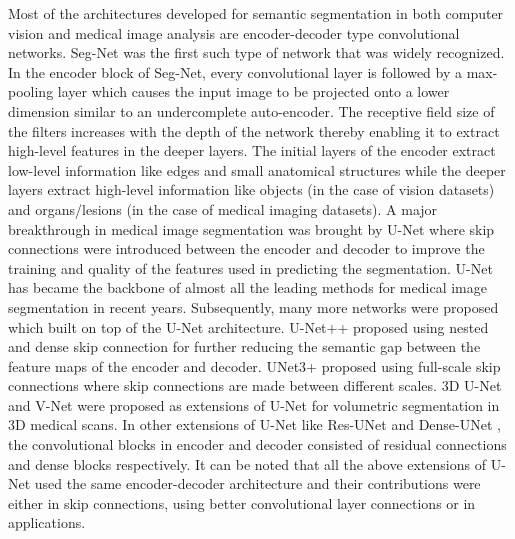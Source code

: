 \documentclass[journal,twoside,web]{ieeecolor}
\begin{document}
Most of the architectures developed for semantic segmentation in both computer vision and medical image analysis are encoder-decoder type convolutional networks. Seg-Net \cite{badrinarayanan2017segnet} was the first such type of network that was widely recognized. In the encoder block of Seg-Net, every convolutional layer is followed by a max-pooling layer which causes the input image to be projected onto a lower dimension similar to an undercomplete auto-encoder. The receptive field size of the filters increases with the depth of the network thereby enabling it to extract high-level features in the deeper layers. The initial layers of the encoder extract low-level information like edges and small anatomical structures while the deeper layers extract high-level information like objects (in the case of vision datasets) and organs/lesions (in the case of medical imaging datasets). A major breakthrough in medical image segmentation was brought by U-Net \cite{ronneberger2015u} where skip connections were introduced between the encoder and decoder to improve the training and quality of the features used in predicting the segmentation. U-Net has became the backbone of almost all the leading methods for medical image segmentation in recent years. Subsequently, many more networks were proposed which built on top of the U-Net architecture. U-Net++ \cite{zhou2018unet++,zhou2019unet++} proposed  using nested and dense skip connection for further reducing the semantic gap between the feature maps of the encoder and decoder. UNet3+ \cite{huang2020unet} proposed using full-scale skip connections where skip connections are made between different scales. 3D U-Net \cite{cciccek20163d} and  V-Net \cite{milletari2016v} were proposed as extensions of U-Net for volumetric segmentation in 3D medical scans. In other extensions of U-Net like Res-UNet \cite{xiao2018weighted} and Dense-UNet \cite{li2018h},   the convolutional blocks in encoder and decoder consisted of residual connections \cite{he2016deep} and dense blocks \cite{huang2017densely} respectively.  It can be noted that all the above extensions of U-Net used the same encoder-decoder architecture and their contributions were either in skip connections, using better convolutional layer connections or in applications.  
\end{document}
